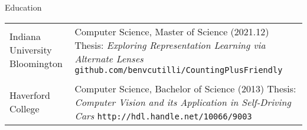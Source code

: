 \begin{LARGE}
Education
\end{LARGE} \vspace{10pt}

\begin{center}

    \begin{tabular}{p{2.0in} p{4.0in}}
        Indiana University Bloomington
                                       &
                                          Computer Science, Master of Science (2021.12) \newline
                                          Thesis: \textit{Exploring Representation Learning via
                                          Alternate Lenses} \newline
                                          \texttt{github.com/benvcutilli/CountingPlusFriendly}
                                         \\

        \vspace{16pt} \\

        Haverford College
                                       &
                                          Computer Science, Bachelor of Science (2013) \newline
                                          Thesis: \textit{Computer Vision and its Application in
                                          Self-Driving Cars} \newline
                                          \texttt{http://hdl.handle.net/10066/9003}
                                         \\
    \end{tabular} \\[0.5in]

\end{center}







